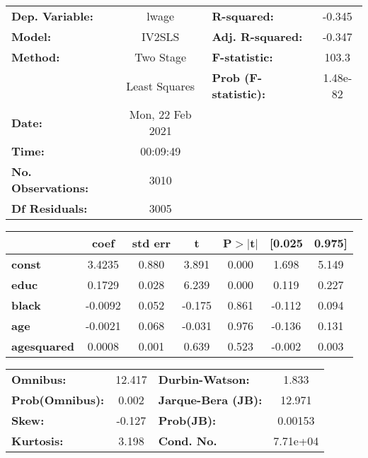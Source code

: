 \begin{center}
\begin{tabular}{lclc}
\toprule
\textbf{Dep. Variable:}    &      lwage       & \textbf{  R-squared:         } &    -0.345   \\
\textbf{Model:}            &      IV2SLS      & \textbf{  Adj. R-squared:    } &    -0.347   \\
\textbf{Method:}           &    Two Stage     & \textbf{  F-statistic:       } &     103.3   \\
\textbf{}                  &  Least Squares   & \textbf{  Prob (F-statistic):} &  1.48e-82   \\
\textbf{Date:}             & Mon, 22 Feb 2021 & \textbf{                     } &             \\
\textbf{Time:}             &     00:09:49     & \textbf{                     } &             \\
\textbf{No. Observations:} &        3010      & \textbf{                     } &             \\
\textbf{Df Residuals:}     &        3005      & \textbf{                     } &             \\
\bottomrule
\end{tabular}
\begin{tabular}{lcccccc}
                    & \textbf{coef} & \textbf{std err} & \textbf{t} & \textbf{P$> |$t$|$} & \textbf{[0.025} & \textbf{0.975]}  \\
\midrule
\textbf{const}      &       3.4235  &        0.880     &     3.891  &         0.000        &        1.698    &        5.149     \\
\textbf{educ}       &       0.1729  &        0.028     &     6.239  &         0.000        &        0.119    &        0.227     \\
\textbf{black}      &      -0.0092  &        0.052     &    -0.175  &         0.861        &       -0.112    &        0.094     \\
\textbf{age}        &      -0.0021  &        0.068     &    -0.031  &         0.976        &       -0.136    &        0.131     \\
\textbf{agesquared} &       0.0008  &        0.001     &     0.639  &         0.523        &       -0.002    &        0.003     \\
\bottomrule
\end{tabular}
\begin{tabular}{lclc}
\textbf{Omnibus:}       & 12.417 & \textbf{  Durbin-Watson:     } &    1.833  \\
\textbf{Prob(Omnibus):} &  0.002 & \textbf{  Jarque-Bera (JB):  } &   12.971  \\
\textbf{Skew:}          & -0.127 & \textbf{  Prob(JB):          } &  0.00153  \\
\textbf{Kurtosis:}      &  3.198 & \textbf{  Cond. No.          } & 7.71e+04  \\
\bottomrule
\end{tabular}
\end{center}
